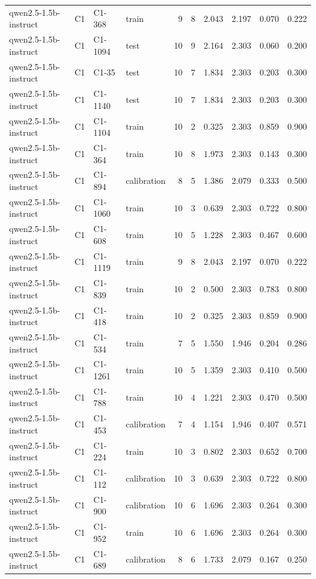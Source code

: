 \begin{table}
\begin{tabular}{llllrrrrrr}
qwen2.5-1.5b-instruct & C1 & C1-368 & train & 9 & 8 & 2.043 & 2.197 & 0.070 & 0.222 \\
qwen2.5-1.5b-instruct & C1 & C1-1094 & test & 10 & 9 & 2.164 & 2.303 & 0.060 & 0.200 \\
qwen2.5-1.5b-instruct & C1 & C1-35 & test & 10 & 7 & 1.834 & 2.303 & 0.203 & 0.300 \\
qwen2.5-1.5b-instruct & C1 & C1-1140 & test & 10 & 7 & 1.834 & 2.303 & 0.203 & 0.300 \\
qwen2.5-1.5b-instruct & C1 & C1-1104 & train & 10 & 2 & 0.325 & 2.303 & 0.859 & 0.900 \\
qwen2.5-1.5b-instruct & C1 & C1-364 & train & 10 & 8 & 1.973 & 2.303 & 0.143 & 0.300 \\
qwen2.5-1.5b-instruct & C1 & C1-894 & calibration & 8 & 5 & 1.386 & 2.079 & 0.333 & 0.500 \\
qwen2.5-1.5b-instruct & C1 & C1-1060 & train & 10 & 3 & 0.639 & 2.303 & 0.722 & 0.800 \\
qwen2.5-1.5b-instruct & C1 & C1-608 & train & 10 & 5 & 1.228 & 2.303 & 0.467 & 0.600 \\
qwen2.5-1.5b-instruct & C1 & C1-1119 & train & 9 & 8 & 2.043 & 2.197 & 0.070 & 0.222 \\
qwen2.5-1.5b-instruct & C1 & C1-839 & train & 10 & 2 & 0.500 & 2.303 & 0.783 & 0.800 \\
qwen2.5-1.5b-instruct & C1 & C1-418 & train & 10 & 2 & 0.325 & 2.303 & 0.859 & 0.900 \\
qwen2.5-1.5b-instruct & C1 & C1-534 & train & 7 & 5 & 1.550 & 1.946 & 0.204 & 0.286 \\
qwen2.5-1.5b-instruct & C1 & C1-1261 & train & 10 & 5 & 1.359 & 2.303 & 0.410 & 0.500 \\
qwen2.5-1.5b-instruct & C1 & C1-788 & train & 10 & 4 & 1.221 & 2.303 & 0.470 & 0.500 \\
qwen2.5-1.5b-instruct & C1 & C1-453 & calibration & 7 & 4 & 1.154 & 1.946 & 0.407 & 0.571 \\
qwen2.5-1.5b-instruct & C1 & C1-224 & train & 10 & 3 & 0.802 & 2.303 & 0.652 & 0.700 \\
qwen2.5-1.5b-instruct & C1 & C1-112 & calibration & 10 & 3 & 0.639 & 2.303 & 0.722 & 0.800 \\
qwen2.5-1.5b-instruct & C1 & C1-900 & calibration & 10 & 6 & 1.696 & 2.303 & 0.264 & 0.300 \\
qwen2.5-1.5b-instruct & C1 & C1-952 & train & 10 & 6 & 1.696 & 2.303 & 0.264 & 0.300 \\
qwen2.5-1.5b-instruct & C1 & C1-689 & calibration & 8 & 6 & 1.733 & 2.079 & 0.167 & 0.250 \\

\end{tabular}
\end{table}
